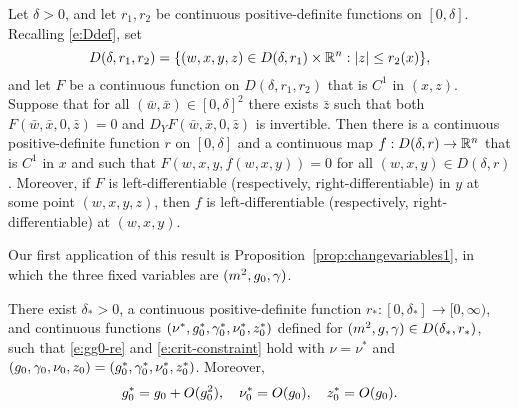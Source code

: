 \begin{prop}
\label{prop:IFT}
Let $\delta > 0$, and let $r_1, r_2$ be continuous positive-definite functions on $[0, \delta]$.
Recalling \eqref{e:Ddef}, set
\begin{equation}
		D(\delta, r_1, r_2)
		=
		\{ (w, x, y, z) \in D(\delta, r_1) \times {\mathbb R}^n : |z| \leq r_2(x) \},
\end{equation}
and let $F$ be a continuous function on $D(\delta, r_1, r_2)$ that is $C^1$ in $(x, z)$.
Suppose that for all $(\bar w, \bar x) \in [0, \delta]^2$ there exists $\bar z$
such that both $F(\bar w, \bar x, 0, \bar z) = 0$
and $D_Y F(\bar w, \bar x, 0, \bar z)$ is invertible.
Then there is a continuous positive-definite function $r$ on $[0, \delta]$ and
a continuous map $f : D(\delta, r) \rightarrow {\mathbb R}^n$
that is $C^1$ in $x$
and such that $F(w, x, y, f(w, x, y)) = 0$
for all $(w, x, y) \in D(\delta, r)$.
Moreover, if $F$ is left-differentiable
(respectively, right-differentiable) in $y$ at some point $(w, x, y, z)$,
then $f$ is left-differentiable (respectively, right-differentiable) at $(w, x, y)$.
\end{prop}

Our first application of this result is Proposition~\ref{prop:changevariables1},
in which the three fixed variables are $(m^2, g_0, \gamma)$.

\begin{prop}
\label{prop:changevariables1}
There exist $\delta_* > 0$,
a continuous positive-definite function $r_* : [0, \delta_*] \to [0, \infty)$,
and continuous functions $(\nu^*, g_0^*, \gamma_0^*, \nu_0^*, z_0^*)$
defined for $(m^2, g, \gamma) \in D(\delta_*, r_*)$, such that
\eqref{e:gg0-re} and \eqref{e:crit-constraint} hold with $\nu = \nu^*$ and
$(g_0, \gamma_0, \nu_0, z_0) = (g^*_0, \gamma^*_0, \nu^*_0, z^*_0)$.
Moreover,
\begin{gather}
\label{e:gznustarbd}
g_0^* = g_0 + O(g_0^2),
\quad
\nu_0^* = O(g_0),
\quad
z_0^* = O(g_0).
\end{gather}
\end{prop}

